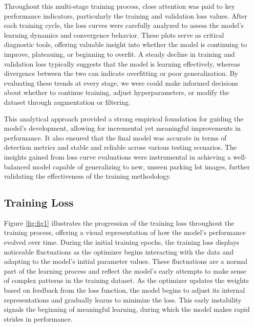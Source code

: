 \documentclass[conference]{IEEEtran}
\begin{document}
Throughout this multi-stage training process, 
close attention was paid to key performance indicators, 
particularly the training and validation loss values. 
After each training cycle, 
the loss curves were carefully analyzed to assess the model's learning dynamics and convergence behavior. 
These plots serve as critical diagnostic tools, 
offering valuable insight into whether the model is continuing to improve, 
plateauing, 
or beginning to overfit. 
A steady decline in training and validation loss typically suggests that the model is learning effectively, 
whereas divergence between the two can indicate overfitting or poor generalization. 
By evaluating these trends at every stage, 
we were could make informed decisions about whether to continue training, 
adjust hyperparameters, 
or modify the dataset through augmentation or filtering.

This analytical approach provided a strong empirical foundation for guiding the model’s development, 
allowing for incremental yet meaningful improvements in performance. 
It also ensured that the final model was accurate in terms of detection metrics and stable and reliable across various testing scenarios. 
The insights gained from loss curve evaluations were instrumental in achieving a well-balanced model capable of generalizing to new, 
unseen parking lot images, 
further validating the effectiveness of the training methodology.


\subsection{Training Loss}

Figure \ref{fig:fig1} illustrates the progression of the training loss throughout the training process, offering a visual representation of how the model’s performance evolved over time. During the initial training epochs, the training loss displays noticeable fluctuations as the optimizer begins interacting with the data and adapting to the model’s initial parameter values. These fluctuations are a normal part of the learning process and reflect the model's early attempts to make sense of complex patterns in the training dataset. As the optimizer updates the weights based on feedback from the loss function, the model begins to adjust its internal representations and gradually learns to minimize the loss. This early instability signals the beginning of meaningful learning, during which the model makes rapid strides in performance.
\end{document}

